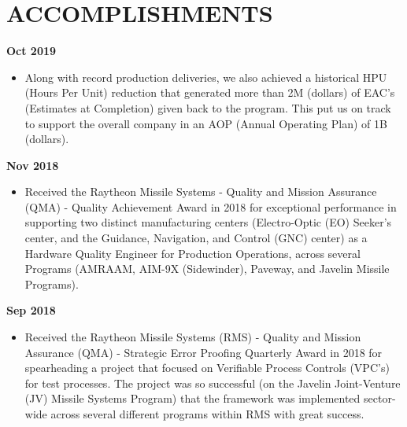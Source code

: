 \documentclass[AutoFakeBold]{resume}
\begin{document}
\section{\makebox[.75em][c]{\faTrophy} \textbf{ACCOMPLISHMENTS}}
 {\textbf{Oct 2019}}
\begin{itemize}
    \item  Along with record production deliveries, we also achieved a historical HPU (Hours Per Unit) reduction that generated more than 2M (dollars) of EAC's (Estimates at Completion) given back to the program. This put us on track to support the overall company in an AOP (Annual Operating Plan) of 1B (dollars).
\end{itemize}
 {\textbf{Nov 2018}}
\begin{itemize}
    \item  Received the Raytheon Missile Systems - Quality and Mission Assurance (QMA) - Quality Achievement Award in 2018 for exceptional performance in supporting two distinct manufacturing centers (Electro-Optic (EO) Seeker’s center, and the Guidance, Navigation, and Control (GNC) center) as a Hardware Quality Engineer for Production Operations, across several Programs (AMRAAM, AIM-9X (Sidewinder), Paveway, and Javelin Missile Programs).
\end{itemize}
 {\textbf{Sep 2018}}
\begin{itemize}
    \item  Received the Raytheon Missile Systems (RMS) - Quality and Mission Assurance (QMA) - Strategic Error Proofing Quarterly Award in 2018 for spearheading a project that focused on Verifiable Process Controls (VPC's) for test processes. The project was so successful (on the Javelin Joint-Venture (JV) Missile Systems Program) that the framework was implemented sector-wide across several different programs within RMS with great success.
\end{itemize}
\end{document}
